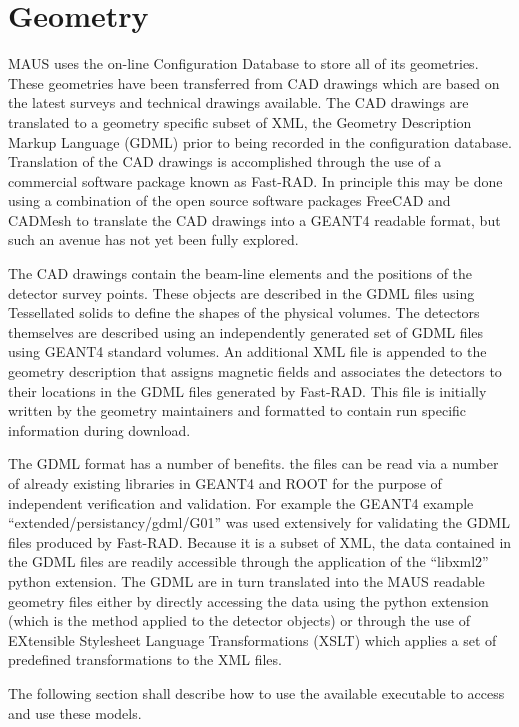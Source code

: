 \chapter{Geometry}
\label{chapter:geometry}
MAUS uses the on-line Configuration Database to store all of its
geometries. These geometries have been transferred from CAD drawings
which are based on the latest surveys and technical drawings
available. The CAD drawings are translated to a geometry specific
subset of XML, the Geometry Description Markup Language (GDML) prior
to being recorded in the configuration database. Translation of the CAD
drawings is accomplished through the use of a commercial software
package known as Fast-RAD. In principle this may be done using a
combination of the open source software packages FreeCAD and
CADMesh to translate the CAD drawings into a GEANT4 readable format,
but such an avenue has not yet been fully explored. 

The CAD drawings contain the beam-line elements and the positions of
the detector survey points. These objects are described in the GDML
files using Tessellated solids to define the shapes of the physical
volumes. The detectors themselves are described using an independently
generated set of GDML files using GEANT4 standard volumes. An
additional XML file is appended to the geometry description that
assigns magnetic fields and associates the detectors to their
locations in the GDML files generated by Fast-RAD. This file is
initially written by the geometry maintainers and formatted to contain
run specific information during download.

The GDML format has a number of benefits. the files can be read via a
number of already existing libraries in GEANT4 and ROOT for the
purpose of independent verification and validation. For example the
GEANT4 example ``extended/persistancy/gdml/G01'' was used extensively
for validating the GDML files produced by Fast-RAD. Because it is a
subset of XML, the data contained in the GDML files are readily
accessible through the application of the ``libxml2'' python
extension. The GDML are in turn translated into the MAUS readable
geometry files either by directly accessing the data using the python
extension (which is the method applied to the detector objects) or
through the use of EXtensible Stylesheet Language Transformations
(XSLT) which applies a set of predefined transformations to the XML
files.

The following section shall describe how to use the available
executable to access and use these models.

